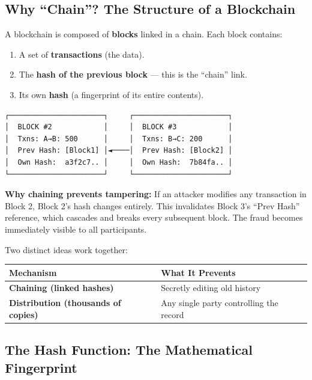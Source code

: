 \documentclass[12pt, a4paper]{article}
\begin{document}
\subsection{Why ``Chain''? The Structure of a Blockchain}

A blockchain is composed of \textbf{blocks} linked in a chain. Each block contains:
\begin{enumerate}
    \item A set of \textbf{transactions} (the data).
    \item The \textbf{hash of the previous block} --- this is the ``chain'' link.
    \item Its own \textbf{hash} (a fingerprint of its entire contents).
\end{enumerate}

\begin{verbatim}
┌──────────────────────┐     ┌──────────────────────┐
│  BLOCK #2            │     │  BLOCK #3            │
│  Txns: A→B: 500      │     │  Txns: B→C: 200      │
│  Prev Hash: [Block1] │◄────│  Prev Hash: [Block2] │
│  Own Hash:  a3f2c7.. │     │  Own Hash:  7b84fa.. │
└──────────────────────┘     └──────────────────────┘
\end{verbatim}

\textbf{Why chaining prevents tampering:} If an attacker modifies any transaction
in Block 2, Block 2's hash changes entirely. This invalidates Block 3's
``Prev Hash'' reference, which cascades and breaks every subsequent block.
The fraud becomes immediately visible to all participants.

Two distinct ideas work together:

\begin{center}
\begin{tabular}{>{\bfseries}l l}
\toprule
Mechanism & What It Prevents \\
\midrule
Chaining (linked hashes) & Secretly editing old history \\
Distribution (thousands of copies) & Any single party controlling the record \\
\bottomrule
\end{tabular}
\end{center}

\subsection{The Hash Function: The Mathematical Fingerprint}
\end{document}
